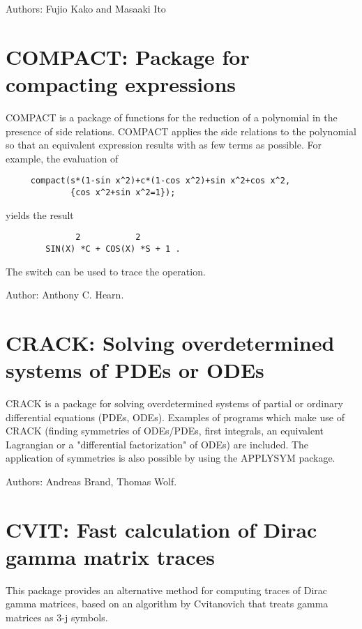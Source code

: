 Authors: Fujio Kako and Masaaki Ito



\newpage

\section{COMPACT: Package for compacting expressions} 

COMPACT is a package of functions for the reduction of a polynomial in the
presence of side relations.  COMPACT applies the side relations to the
polynomial so that an equivalent expression results with as few terms as
possible.  For example, the evaluation of
\begin{verbatim}
     compact(s*(1-sin x^2)+c*(1-cos x^2)+sin x^2+cos x^2,
             {cos x^2+sin x^2=1});
\end{verbatim}
yields the result\pagebreak[1]
\begin{verbatim}
              2           2
        SIN(X) *C + COS(X) *S + 1 .
\end{verbatim}
The switch  can be used to trace the operation.

Author:  Anthony C. Hearn.


\newpage

\section{CRACK: Solving overdetermined systems of PDEs or ODEs}

CRACK is a package for solving overdetermined systems of partial or
ordinary differential equations (PDEs, ODEs).  Examples of programs which
make use of CRACK (finding symmetries of ODEs/PDEs, first integrals, an
equivalent Lagrangian or a "differential factorization" of ODEs) are
included.  The application of symmetries is also possible by using the
APPLYSYM package.

Authors: Andreas Brand, Thomas Wolf.

\newpage

\section{CVIT: Fast calculation of Dirac gamma matrix traces}
\label{CVIT}

This package provides an alternative method for computing traces of Dirac
gamma matrices, based on an algorithm by Cvitanovich that treats gamma
matrices as 3-j symbols.

